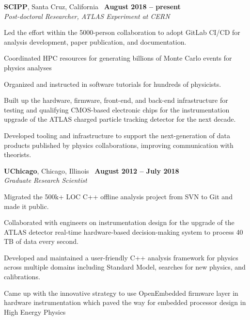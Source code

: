 \documentclass[margin,line]{resume}
\begin{document}
\begin{resume}
\textbf{SCIPP}, Santa Cruz, California \hfill \faCalendar\ \textbf{August 2018 -- present}\\
\textsl{Post-doctoral Researcher, ATLAS Experiment at CERN}
\begin{list2}
  \small
  \item Led the effort within the 5000-person collaboration to adopt GitLab CI/CD for analysis development, paper publication, and documentation.
  \item Coordinated HPC resources for generating billions of Monte Carlo events for physics analyses
  \item Organized and instructed in software tutorials for hundreds of physicists.
  \item Built up the hardware, firmware, front-end, and back-end infrastructure for testing and qualifying CMOS-based electronic chips for the instrumentation upgrade of the ATLAS charged particle tracking detector for the next decade.
  \item Developed tooling and infrastructure to support the next-generation of data products published by physics collaborations, improving communication with theorists.
\end{list2}

\textbf{UChicago}, Chicago, Illinois \hfill \faCalendar\ \textbf{August 2012 -- July 2018}\\
\textsl{Graduate Research Scientist}
\begin{list2}
  \small
  \item Migrated the 500k+ LOC C++ offline analysis project from SVN to Git and made it public.
  \item Collaborated with engineers on instrumentation design for the upgrade of the ATLAS detector real-time hardware-based decision-making system to process 40 TB of data every second.
  \item Developed and maintained a user-friendly C++ analysis framework for physics across multiple domains including Standard Model, searches for new physics, and calibrations.
  \item Came up with the innovative strategy to use OpenEmbedded firmware layer in hardware instrumentation which paved the way for embedded processor design in High Energy Physics
\end{list2}


\end{resume}
\end{document}
